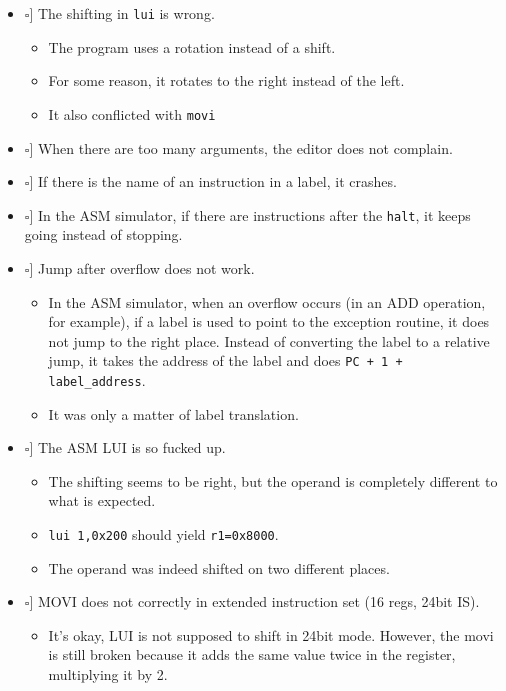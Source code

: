 \documentclass[12pt,a4paper]{extarticle}
\newcommand{\done}{\makebox[0pt][l]{$\square$}\raisebox{.15ex}{\hspace{0.1em}$\checkmark$}}%
\newcommand{\notdone}{\makebox[1em][l]{$\square$}}
\begin{document}
\begin{itemize}
  \item[\done] The shifting in \texttt{lui} is wrong.
    \begin{itemize}
      \item The program uses a rotation instead of a shift.
      \item For some reason, it rotates to the right instead of the left.
      \item It also conflicted with \texttt{movi}
    \end{itemize}

    \item[\notdone] When there are too many arguments, the editor does not complain.

    \item[\notdone] If there is the name of an instruction in a label, it crashes.

    \item[\notdone] In the ASM simulator, if there are instructions after the \texttt{halt}, it keeps going instead of stopping.

    \item[\done] Jump after overflow does not work.
    \begin{itemize}
      \item In the ASM simulator, when an overflow occurs (in an ADD operation, for example), if a label is used to point to the exception routine, it does not jump to the right place.
      Instead of converting the label to a relative jump, it takes the address of the label and does \verb|PC + 1 + label_address|.
      \item It was only a matter of label translation.
    \end{itemize}

    \item[\done] The ASM LUI is so fucked up.
    \begin{itemize}
      \item The shifting seems to be right, but the operand is completely different to what is expected.
      \item \texttt{lui 1,0x200} should yield \texttt{r1=0x8000}.
      \item The operand was indeed shifted on two different places.
    \end{itemize}

    \item[\notdone] MOVI does not correctly in extended instruction set (16 regs, 24bit IS).
    \begin{itemize}
      \item It's okay, LUI is not supposed to shift in 24bit mode.
      However, the movi is still broken because it adds the same value twice in the register, multiplying it by 2.
    \end{itemize}



\end{itemize}
\end{document}
